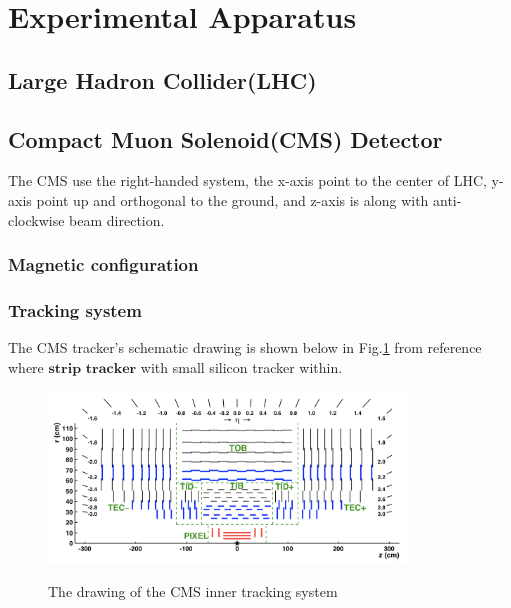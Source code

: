 

\clearpage
\section{Experimental Apparatus}
\label{sec:ExperimentalAppratus}

	\subsection{Large Hadron Collider(LHC)}
	\label{ssec:ExpApp_LHC}

	\subsection{Compact Muon Solenoid(CMS) Detector}
	\label{ssec:ExpApp_CMS}

		The CMS use the right-handed system, the x-axis point to the center of LHC, y-axis point up and orthogonal to the ground, and z-axis is along with anti-clockwise beam direction.

		\subsubsection{Magnetic configuration}
		\label{sssec:ExpApp_magnetic}


		\subsubsection{Tracking system}
		\label{sssec:ExpApp_tracking}

			The CMS tracker's schematic drawing is shown below in Fig.\ref{PhysObj:fig:tracker} from reference\cite{Chatrchyan:2014fea} where $\textbf{strip tracker}$ with small silicon tracker within. 

			\begin{figure}[H]
			\centering{}
		    	\includegraphics[width=0.85\textwidth]{Figures/ExpApparatus/tracker.png}\\
			\caption{The drawing of the CMS inner tracking system\cite{Chatrchyan:2014fea}}
			\label{PhysObj:fig:tracker}
			\end{figure}
			\FloatBarrier

